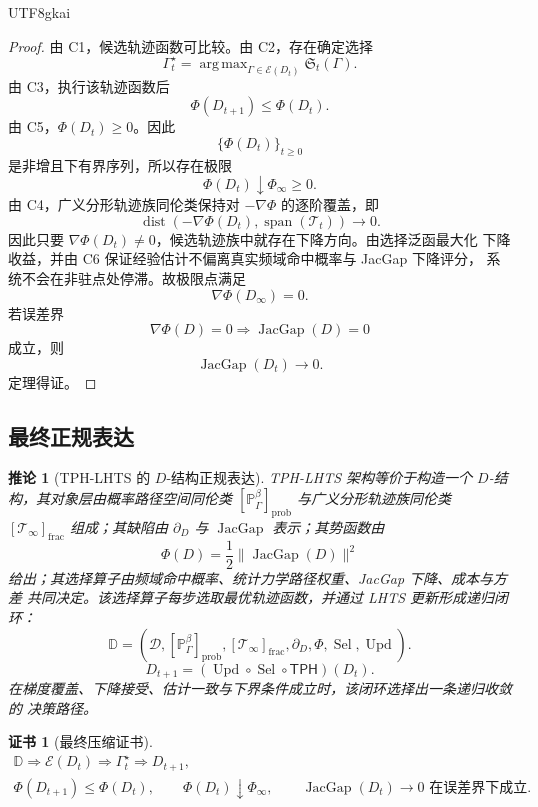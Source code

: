 \documentclass[12pt]{article}
\newtheorem{corollary}{推论}[section]
\newtheorem{Certificate}{证书}[section]
\newcommand{\TPH}{\ensuremath{\mathsf{TPH}}}
\DeclareMathOperator{\JacGap}{JacGap}
\DeclareMathOperator{\Span}{span}
\DeclareMathOperator{\Sel}{Sel}
\DeclareMathOperator{\dist}{dist}
\DeclareMathOperator{\Upd}{Upd}
\DeclareMathOperator*{\argmax}{arg\,max}
\begin{document}
\begin{CJK*}{UTF8}{gkai}
\begin{proof}
由 C1，候选轨迹函数可比较。由 C2，存在确定选择
\[
\Gamma_t^\star
=
\argmax_{\Gamma\in\mathcal E(D_t)}
\mathfrak S_t(\Gamma).
\]
由 C3，执行该轨迹函数后
\[
\Phi(D_{t+1})\le\Phi(D_t).
\]
由 C5，\(\Phi(D_t)\ge0\)。因此
\[
\{\Phi(D_t)\}_{t\ge0}
\]
是非增且下有界序列，所以存在极限
\[
\Phi(D_t)\downarrow\Phi_\infty\ge0.
\]
由 C4，广义分形轨迹族同伦类保持对 \(-\nabla\Phi\) 的逐阶覆盖，即
\[
\dist\!\left(-\nabla\Phi(D_t),\Span(\mathcal T_t)\right)\to0.
\]
因此只要 \(\nabla\Phi(D_t)\ne0\)，候选轨迹族中就存在下降方向。由选择泛函最大化
下降收益，并由 C6 保证经验估计不偏离真实频域命中概率与 JacGap 下降评分，
系统不会在非驻点处停滞。故极限点满足
\[
\nabla\Phi(D_\infty)=0.
\]
若误差界
\[
\nabla\Phi(D)=0\Rightarrow\JacGap(D)=0
\]
成立，则
\[
\JacGap(D_t)\to0.
\]
定理得证。
\end{proof}

\subsection{最终正规表达}
\label{subsec:d-structure-final-statement}

\begin{corollary}[TPH-LHTS 的 \(D\)-结构正规表达]
TPH-LHTS 架构等价于构造一个 \(D\)-结构，其对象层由概率路径空间同伦类
\([\mathbb P_\Gamma^\beta]_{\mathrm{prob}}\) 与广义分形轨迹族同伦类
\([\mathcal T_\infty]_{\mathrm{frac}}\) 组成；其缺陷由 \(\partial_D\) 与
\(\JacGap\) 表示；其势函数由
\[
\Phi(D)=\frac12\|\JacGap(D)\|^2
\]
给出；其选择算子由频域命中概率、统计力学路径权重、JacGap 下降、成本与方差
共同决定。该选择算子每步选取最优轨迹函数，并通过 LHTS 更新形成递归闭环：
\[
\boxed{
\mathbb D
=
\left(
\mathcal D,
[\mathbb P_\Gamma^\beta]_{\mathrm{prob}},
[\mathcal T_\infty]_{\mathrm{frac}},
\partial_D,
\Phi,
\Sel,
\Upd
\right).
}
\]
\[
\boxed{
D_{t+1}=(\Upd\circ\Sel\circ\TPH)(D_t).
}
\]
在梯度覆盖、下降接受、估计一致与下界条件成立时，该闭环选择出一条递归收敛的
决策路径。
\end{corollary}

\begin{Certificate}[最终压缩证书]
\[
\boxed{
\begin{gathered}
\mathbb D
\Rightarrow
\mathcal E(D_t)
\Rightarrow
\Gamma_t^\star
\Rightarrow
D_{t+1},
\\
\Phi(D_{t+1})\le\Phi(D_t),
\qquad
\Phi(D_t)\downarrow\Phi_\infty,
\qquad
\JacGap(D_t)\to0\text{ 在误差界下成立}.
\end{gathered}
}
\]
\end{Certificate}


\end{CJK*}
\end{document}
